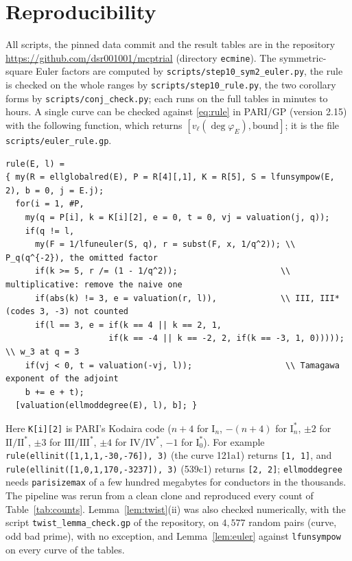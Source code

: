 \documentclass[11pt]{amsart}
\theoremstyle{definition}
\newcommand{\degphi}{\deg\varphi_E}
\begin{document}
\section{Reproducibility}
All scripts, the pinned data commit and the result tables are in the repository \url{https://github.com/dsr001001/mcptrial} (directory \texttt{ecmine}). The symmetric-square Euler factors are computed by \texttt{scripts/step10\_sym2\_euler.py}, the rule is checked on the whole ranges by \texttt{scripts/step10\_rule.py}, the two corollary forms by \texttt{scripts/conj\_check.py}; each runs on the full tables in minutes to hours. A single curve can be checked against \eqref{eq:rule} in PARI/GP (version 2.15) with the following function, which returns $[v_\ell(\degphi),\text{bound}]$; it is the file \texttt{scripts/euler\_rule.gp}.
{\footnotesize\begin{verbatim}
rule(E, l) =
{ my(R = ellglobalred(E), P = R[4][,1], K = R[5], S = lfunsympow(E, 2), b = 0, j = E.j);
  for(i = 1, #P,
    my(q = P[i], k = K[i][2], e = 0, t = 0, vj = valuation(j, q));
    if(q != l,
      my(F = 1/lfuneuler(S, q), r = subst(F, x, 1/q^2)); \\ P_q(q^{-2}), the omitted factor
      if(k >= 5, r /= (1 - 1/q^2));                     \\ multiplicative: remove the naive one
      if(abs(k) != 3, e = valuation(r, l)),             \\ III, III* (codes 3, -3) not counted
      if(l == 3, e = if(k == 4 || k == 2, 1,
                     if(k == -4 || k == -2, 2, if(k == -3, 1, 0)))));   \\ w_3 at q = 3
    if(vj < 0, t = valuation(-vj, l));                   \\ Tamagawa exponent of the adjoint
    b += e + t);
  [valuation(ellmoddegree(E), l), b]; }
\end{verbatim}}
Here \texttt{K[i][2]} is PARI's Kodaira code ($n+4$ for $\mathrm{I}_n$, $-(n+4)$ for $\mathrm{I}_n^*$, $\pm2$ for $\mathrm{II}/\mathrm{II}^*$, $\pm3$ for $\mathrm{III}/\mathrm{III}^*$, $\pm4$ for $\mathrm{IV}/\mathrm{IV}^*$, $-1$ for $\mathrm{I}_0^*$). For example \texttt{rule(ellinit([1,1,1,-30,-76]), 3)} (the curve 121a1) returns \texttt{[1, 1]}, and \texttt{rule(ellinit([1,0,1,170,-3237]), 3)} (539c1) returns \texttt{[2, 2]}; \texttt{ellmoddegree} needs \texttt{parisizemax} of a few hundred megabytes for conductors in the thousands. The pipeline was rerun from a clean clone and reproduced every count of Table~\ref{tab:counts}. Lemma~\ref{lem:twist}(ii) was also checked numerically, with the script \texttt{twist\_lemma\_check.gp} of the repository, on $4{,}577$ random pairs (curve, odd bad prime), with no exception, and Lemma~\ref{lem:euler} against \texttt{lfunsympow} on every curve of the tables.
\end{document}
